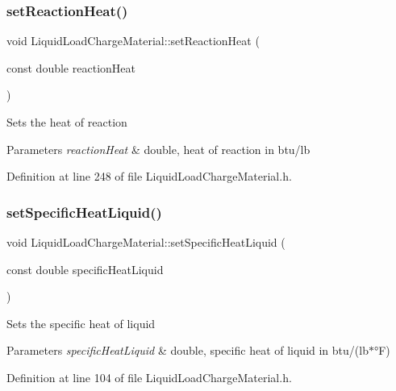 \subsubsection{\texorpdfstring{set\+Reaction\+Heat()}{setReactionHeat()}}
{\footnotesize\ttfamily void Liquid\+Load\+Charge\+Material\+::set\+Reaction\+Heat (\begin{DoxyParamCaption}\item[{const double}]{reaction\+Heat }\end{DoxyParamCaption})\hspace{0.3cm}{\ttfamily [inline]}}

Sets the heat of reaction 
\begin{DoxyParams}{Parameters}
{\em reaction\+Heat} & double, heat of reaction in btu/lb \\
\hline
\end{DoxyParams}


Definition at line 248 of file Liquid\+Load\+Charge\+Material.\+h.

\mbox{\label{class_liquid_load_charge_material_a2187c4c6ba394c05ab42e769bf175683}} 
\subsubsection{\texorpdfstring{set\+Specific\+Heat\+Liquid()}{setSpecificHeatLiquid()}}
{\footnotesize\ttfamily void Liquid\+Load\+Charge\+Material\+::set\+Specific\+Heat\+Liquid (\begin{DoxyParamCaption}\item[{const double}]{specific\+Heat\+Liquid }\end{DoxyParamCaption})\hspace{0.3cm}{\ttfamily [inline]}}

Sets the specific heat of liquid 
\begin{DoxyParams}{Parameters}
{\em specific\+Heat\+Liquid} & double, specific heat of liquid in btu/(lb$\ast$°F) \\
\hline
\end{DoxyParams}


Definition at line 104 of file Liquid\+Load\+Charge\+Material.\+h.

\mbox{\label{class_liquid_load_charge_material_ae95faf01cf6293ab282b1b7fe3b849e1}} 
